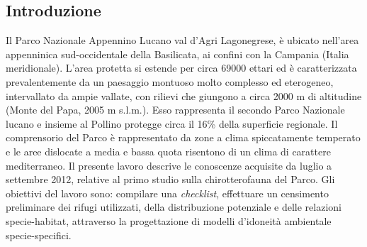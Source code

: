 \begin{multicols}{2}

\section*{Introduzione}
Il Parco Nazionale Appennino Lucano val d’Agri Lagonegrese, è ubicato nell’area appenninica sud-occidentale della Basilicata, ai confini con la Campania (Italia meridionale). L’area protetta si estende per circa 69000 ettari ed è caratterizzata prevalentemente da un paesaggio montuoso molto complesso ed eterogeneo, intervallato da ampie vallate, con rilievi che giungono a circa 2000 m di altitudine (Monte del Papa, 2005 m s.l.m.). Esso rappresenta il secondo Parco Nazionale lucano e insieme al Pollino protegge circa il 16\% della superficie regionale. Il comprensorio del Parco è rappresentato da zone a clima spiccatamente temperato e le aree dislocate a media e bassa quota risentono di un clima di carattere mediterraneo. Il presente lavoro descrive le conoscenze acquisite da luglio a settembre 2012, relative al  primo studio sulla chirotterofauna del Parco. Gli obiettivi del lavoro sono: compilare una \textit{checklist}, effettuare un censimento preliminare dei rifugi utilizzati, della distribuzione potenziale e delle relazioni specie-habitat, attraverso la progettazione di modelli d’idoneità ambientale specie-specifici.


\end{multicols}
